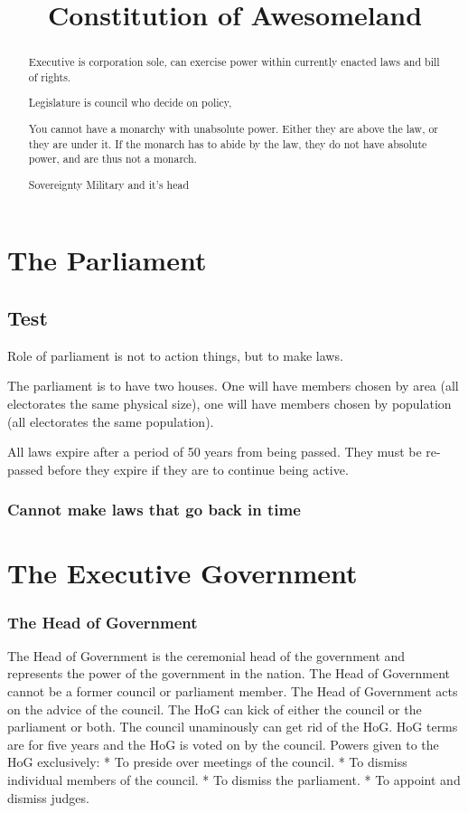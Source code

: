 \documentclass[a4paper]{report}
\title{Constitution of Awesomeland}
\author{}
\begin{document}
\maketitle

\begin{abstract}
	
	Executive is corporation sole, can exercise power within currently enacted laws and bill of rights.
	
	Legislature is council who decide on policy, 
	
	You cannot have a monarchy with unabsolute power. Either they are above the law, or they are under it.
	If the monarch has to abide by the law, they do not have absolute power, and are thus not a monarch.
	
	Sovereignty
	Military and it's head

\end{abstract}

\chapter{The Parliament}

\section{Test}

Role of parliament is not to action things, but to make laws.

The parliament is to have two houses. One will have members chosen by area (all electorates the same physical size), one will have members chosen by population (all electorates the same population).

All laws expire after a period of 50 years from being passed. They must be re-passed before they expire if they are to continue being active.


\subsection{Cannot make laws that go back in time}

\chapter{The Executive Government}

\subsection{The Head of Government}
The Head of Government is the ceremonial head of the government and represents the power of the government in the nation. 
The Head of Government cannot be a former council or parliament member. The Head of Government acts on the advice of the council. 
The HoG can kick of either the council or the parliament or both. The council unaminously can get rid of the HoG. 
HoG terms are for five years and the HoG is voted on by the council. 
Powers given to the HoG exclusively:
* To preside over meetings of the council.
* To dismiss individual members of the council.
* To dismiss the parliament.
* To appoint and dismiss judges.
\end{document}
